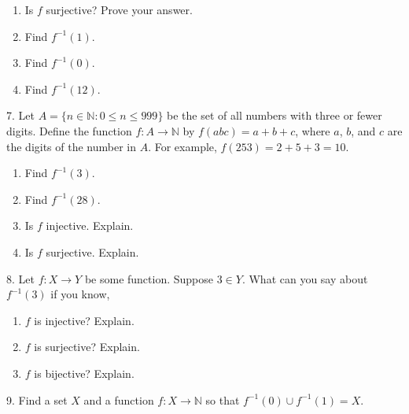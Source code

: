 \documentclass[10pt,]{book}
\theoremstyle{plain}
\theoremstyle{definition}
\theoremstyle{definition}
\theoremstyle{definition}
\numberwithin{equation}{section}
\def\N{\mathbb N}
\def\inv{^{-1}}
\def\st{:}
\begin{document}
\begin{exerciselist}
\begin{enumerate}[label=(\alph*)]
\item\hypertarget{li-321}{}
                Is \(f\) surjective? Prove your answer.
\item\hypertarget{li-322}{}
                Find \(f\inv(1)\).
\item\hypertarget{li-323}{}
                Find \(f\inv(0)\).
\item\hypertarget{li-324}{}
                Find \(f\inv(12)\).
\end{enumerate}
\par\smallskip
\item[7.]\hypertarget{exercise-33}{}
            Let \(A = \{n \in \N \st 0 \le n \le 999\}\) be the set of all numbers with three or fewer digits. Define the function \(f:A \to \N\) by \(f(abc) = a+b+c\), where \(a\), \(b\), and \(c\) are the digits of the number in \(A\). For example, \(f(253) = 2 + 5 + 3 =  10\).
\leavevmode%
\begin{enumerate}[label=(\alph*)]
\item\hypertarget{li-330}{}
                Find \(f\inv(3)\).
\item\hypertarget{li-331}{}
                Find \(f\inv(28)\).
\item\hypertarget{li-332}{}
                Is \(f\) injective. Explain.
\item\hypertarget{li-333}{}
                Is \(f\) surjective. Explain.
\end{enumerate}
\par\smallskip
\item[8.]\hypertarget{exercise-34}{}
            Let \(f:X \to Y\) be some function. Suppose \(3 \in Y\). What can you say about \(f\inv(3)\) if you know,
\leavevmode%
\begin{enumerate}[label=(\alph*)]
\item\hypertarget{li-338}{}\(f\) is injective? Explain.\item\hypertarget{li-339}{}\(f\) is surjective? Explain.\item\hypertarget{li-340}{}\(f\) is bijective? Explain.\end{enumerate}
\par\smallskip
\item[9.]\hypertarget{exercise-35}{}
            Find a set \(X\) and a function \(f:X \to \N\) so that \(f\inv(0) \cup f\inv(1) = X\).
\par\smallskip

\end{exerciselist}
\end{document}
